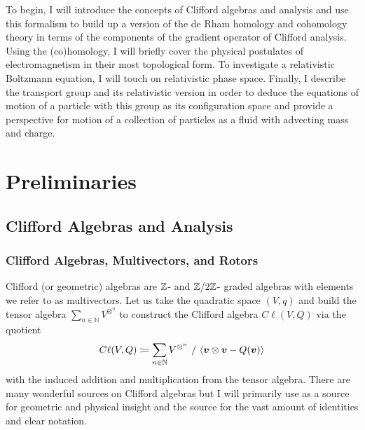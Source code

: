 \documentclass[conf]{new-aiaa}
\begin{document}
To begin, I will introduce the concepts of Clifford algebras and analysis and use this formalism to build up a version of the de Rham homology and cohomology theory in terms of the components of the gradient operator of Clifford analysis. Using the (co)homology, I will briefly cover the physical postulates of electromagnetism in their most topological form. To investigate a relativistic Boltzmann equation, I will touch on relativistic phase space. Finally, I describe the transport group and its relativistic version in order to deduce the equations of motion of a particle with this group as its configuration space and provide a perspective for motion of a collection of particles as a fluid with advecting mass and charge.  

\section{Preliminaries}

\subsection{Clifford Algebras and Analysis}

\subsubsection{Clifford Algebras, Multivectors, and Rotors}

Clifford (or geometric) algebras are $\mathbb{Z}$- and $\mathbb{Z}/2\mathbb{Z}$- graded algebras with elements we refer to as multivectors. Let us take the quadratic space $(V,q)$ and build the tensor algebra $\sum_{n \in \mathbb{N}} V^{\otimes^n}$ to construct the Clifford algebra $C\ell(V,Q)$ via the quotient
\begin{equation}
C\ell(V,Q) \coloneqq \sum_{n \in \mathbb{N}} V^{\otimes^n} ~ / ~ \langle \boldsymbol{v} \otimes \boldsymbol{v} - Q(\boldsymbol{v}) \rangle
\end{equation}
with the induced addition and multiplication from the tensor algebra. There are many wonderful sources on Clifford algebras but I will primarily use \cite{doran_geometric_2003} as a source for geometric and physical insight and the source \cite{chisolm_geometric_2012} for the vast amount of identities and clear notation. 
\end{document}
